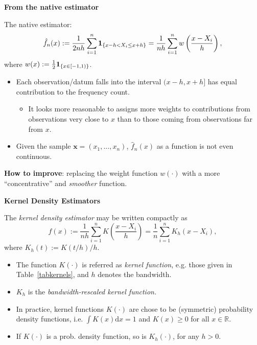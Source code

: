 \documentclass[19pt,landscape]{article}
\newcommand{\bone}{{\bf 1}}
\newcommand{\R}{\mathbb{R}}
\begin{document}
\newpage
{\LARGE\centerline{\textbf{From the native estimator}}}
\vskip25pt
\begin{minipage}{.9\textwidth}
    \Large 
   The native estimator:
   \begin{equation}
    \hat{f}_n(x):=\frac1{2nh}\sum_{i=1}^n\bone_{\{x-h<X_i\le x+h\}}=\frac1{nh}\sum_{i=1}^nw\left(\frac{x-X_i}h\right),
   \end{equation}
    where $w(x):=\frac12\bone_{\left\{x\in [-1,1)\right\}}$. 
    \vskip5pt
    \begin{itemize}
    \item Each observation/datum falls into the interval $(x-h,x+h]$ has equal contribution to the frequency count. 
        \begin{itemize}
            \item It looks more reasonable to assigns more weights to contributions from observations very close to $x$ than to those coming from  observations far from $x$.
        \end{itemize}
    \item Given the sample $\mathbf{x}=(x_1,\dots,x_n)$, $\hat{f}_n(x)$ as a function is not even continuous. 
    \end{itemize}
    {\bf How to improve}: replacing the weight function $w(\cdot)$ with a more ``concentrative'' and {\it smoother} function.
    \end{minipage}

    \newpage
    {\LARGE\centerline{\textbf{Kernel Density Estimators}}}
    \vskip25pt
    \begin{minipage}{.9\textwidth}
        \Large 
       The {\it kernel density estimator} may be written compactly as 
       \begin{equation}\label{def-kde}
        \hat{f}(x):=\frac1{nh}\sum_{i=1}^nK\left(\frac{x-X_i}h\right)=\frac1n\sum_{i=1}^nK_h(x-X_i),
       \end{equation}
        where $K_h(t):=K(t/h)/h$. 
        \vskip5pt
        \begin{itemize}
            \item The function $K(\cdot)$ is referred as {\it kernel function}, e.g. those given in Table~\ref{tabkernels}, and $h$ denotes the bandwidth.
            \item $K_h$ is the {\it bandwidth-rescaled kernel function.}
            \item In practice, kernel functions $K(\cdot)$ are chose to be (symmetric) probability density functions, i.e. $\int K(x)\mathrm{d}x=1$ and $K(x)\ge0$ for all $x\in\R$.
            \item If $K(\cdot)$ is a prob. density function, so is $K_h(\cdot)$, for any $h>0$.
        \end{itemize}
        \end{minipage}
\end{document}
